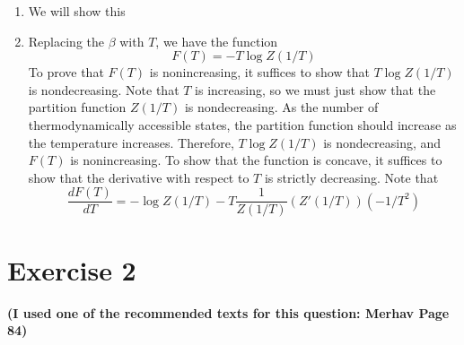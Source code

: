 \documentclass[11pt]{article}
\theoremstyle{definition}
\begin{document}
\begin{enumerate}
\item 
	We will show this

\item
	Replacing the $\beta$ with $T$, we have the function
	\[ F(T) = -T \log Z(1/T)\]
	To prove that $F(T)$ is nonincreasing, it suffices to show that $ T \log Z(1/T)$ is nondecreasing. Note that $T$ is increasing, so we must just show that the partition function $Z(1/T)$ is nondecreasing.
	As the number of thermodynamically accessible states, the partition function should increase as the temperature increases. Therefore, $T \log Z(1/T)$ is nondecreasing, and $F(T)$ is nonincreasing. To show that the function is concave, it suffices to show that the derivative with respect to $T$ is strictly decreasing. Note that
	\[ \frac{dF(T)}{dT} = -\log Z(1/T) - T \frac{1}{Z(1/T)}(Z'(1/T))(-1/T^2)  \]

\end{enumerate}

\newpage
\section{Exercise 2}

\textbf{(I used one of the recommended texts for this question: Merhav Page 84)}
\end{document}
